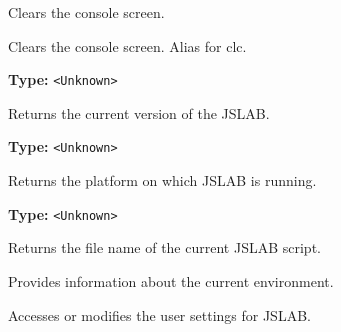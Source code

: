 \documentclass[12pt,a4paper]{article}
\begin{document}
\noindent Clears the console screen.

\vspace{5mm}
\noindent {}


\noindent Clears the console screen. Alias for \textasciigrave{}clc\textasciigrave{}.

\vspace{5mm}
\noindent {}\vspace{4mm}


\noindent \textbf{Type:} \texttt{<Unknown>}

\noindent Returns the current version of the JSLAB.

\vspace{5mm}
\noindent {}\vspace{4mm}


\noindent \textbf{Type:} \texttt{<Unknown>}

\noindent Returns the platform on which JSLAB is running.

\vspace{5mm}
\noindent {}\vspace{4mm}


\noindent \textbf{Type:} \texttt{<Unknown>}

\noindent Returns the file name of the current JSLAB script.

\vspace{5mm}
\noindent {}


\noindent Provides information about the current environment.

\vspace{5mm}
\noindent {}


\noindent Accesses or modifies the user settings for JSLAB.

\vspace{5mm}
\noindent {}
\end{document}
